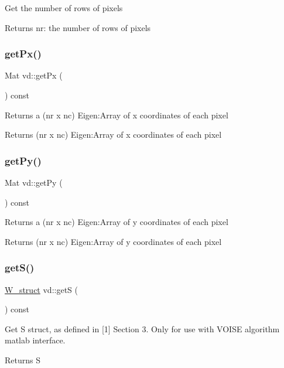 Get the number of rows of pixels \begin{DoxyReturn}{Returns}
nr\+: the number of rows of pixels 
\end{DoxyReturn}
\mbox{\label{classvd_aeba6d318016c8f8b9537ce4c0314f8cd}} 
\subsubsection{\texorpdfstring{get\+Px()}{getPx()}}
{\footnotesize\ttfamily Mat vd\+::get\+Px (\begin{DoxyParamCaption}{ }\end{DoxyParamCaption}) const}

Returns a (nr x nc) Eigen\+:Array of x coordinates of each pixel \begin{DoxyReturn}{Returns}
(nr x nc) Eigen\+:Array of x coordinates of each pixel 
\end{DoxyReturn}
\mbox{\label{classvd_a9738711704b1d03cdbe027b1976cb0c6}} 
\subsubsection{\texorpdfstring{get\+Py()}{getPy()}}
{\footnotesize\ttfamily Mat vd\+::get\+Py (\begin{DoxyParamCaption}{ }\end{DoxyParamCaption}) const}

Returns a (nr x nc) Eigen\+:Array of y coordinates of each pixel \begin{DoxyReturn}{Returns}
(nr x nc) Eigen\+:Array of y coordinates of each pixel 
\end{DoxyReturn}
\mbox{\label{classvd_a7f901e0c6d226b81f262c2363a69844a}} 
\subsubsection{\texorpdfstring{get\+S()}{getS()}}
{\footnotesize\ttfamily \mbox{\hyperlink{structW__struct}{W\+\_\+struct}} vd\+::getS (\begin{DoxyParamCaption}{ }\end{DoxyParamCaption}) const}

Get S struct, as defined in \mbox{[}1\mbox{]} Section 3. Only for use with V\+O\+I\+SE algorithm matlab interface. \begin{DoxyReturn}{Returns}
S 
\end{DoxyReturn}
\mbox{\label{classvd_a82f353c594c3c6b24f6077398f059d3a}} 
